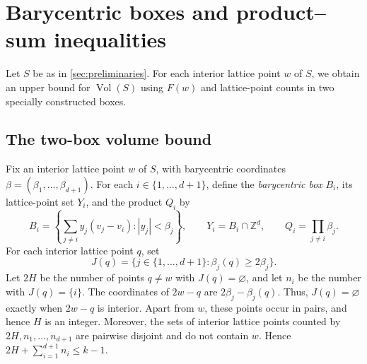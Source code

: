 \documentclass[reqno, 11pt]{article}
\numberwithin{equation}{section}
\theoremstyle{definition}
\begin{document}
\section{Barycentric boxes and product--sum inequalities}\label{sec:geometry}
Let $S$ be as in \cref{sec:preliminaries}.
For each interior lattice point $w$ of $S$, we  obtain an upper bound
for $\operatorname{Vol}(S)$ using $F(w)$ and lattice-point counts
in two specially constructed boxes.

\subsection{The two-box volume bound}
Fix an interior lattice point $w$ of $S$, with barycentric
coordinates $\beta=(\beta_1,\ldots,\beta_{d+1})$.
For each $i\in\{1,\ldots,d+1\}$, define the
\emph{barycentric box} $B_i$, its lattice-point set $Y_i$,
and the product $Q_i$ by
\[
B_i=
\left\{
\sum_{j\ne i}y_j(v_j-v_i): |y_j|<\beta_j
\right\},
\qquad
Y_i=B_i\cap\mathbb{Z}^d,
\qquad
Q_i=\prod_{j\ne i}\beta_j.
\]
For each interior lattice point $q$, set
\[
 J(q)=\{j\in\{1,\ldots,d+1\}:\beta_j(q)\ge2\beta_j\}.
\]
Let $2H$ be the number of points $q\ne w$ with $J(q)=\varnothing$,
and let $n_i$ be the number with $J(q)=\{i\}$.
The coordinates of $2w-q$ are $2\beta_j-\beta_j(q)$. Thus, $J(q)=\varnothing$ exactly when $2w-q$ is interior. Apart from $w$,
these points occur in pairs, and hence $H$ is an integer. Moreover, the sets of interior lattice points counted by
$2H,n_1,\ldots,n_{d+1}$ are pairwise disjoint and do not contain $w$.
Hence $2H+\sum_{i=1}^{d+1}n_i\le k-1.$
\end{document}

